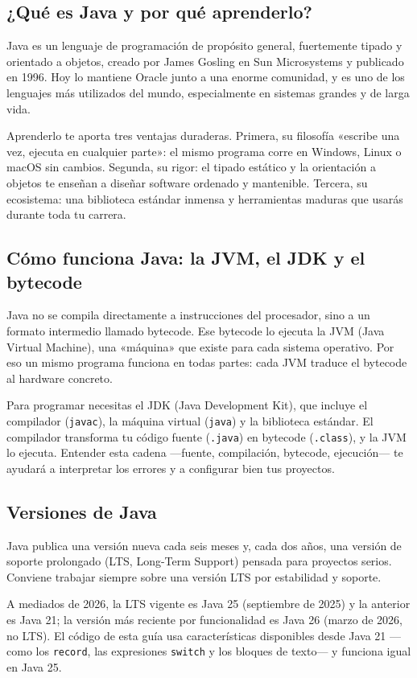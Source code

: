 \documentclass[11pt]{article}
\begin{document}
\subsection{¿Qué es Java y por qué aprenderlo?}
Java es un lenguaje de programación de propósito general, fuertemente tipado y orientado a objetos, creado por James Gosling en Sun Microsystems y publicado en 1996. Hoy lo mantiene Oracle junto a una enorme comunidad, y es uno de los lenguajes más utilizados del mundo, especialmente en sistemas grandes y de larga vida.

Aprenderlo te aporta tres ventajas duraderas. Primera, su filosofía «escribe una vez, ejecuta en cualquier parte»: el mismo programa corre en Windows, Linux o macOS sin cambios. Segunda, su rigor: el tipado estático y la orientación a objetos te enseñan a diseñar software ordenado y mantenible. Tercera, su ecosistema: una biblioteca estándar inmensa y herramientas maduras que usarás durante toda tu carrera.

\subsection{Cómo funciona Java: la JVM, el JDK y el bytecode}
Java no se compila directamente a instrucciones del procesador, sino a un formato intermedio llamado bytecode. Ese bytecode lo ejecuta la JVM (Java Virtual Machine), una «máquina» que existe para cada sistema operativo. Por eso un mismo programa funciona en todas partes: cada JVM traduce el bytecode al hardware concreto.

Para programar necesitas el JDK (Java Development Kit), que incluye el compilador (\texttt{javac}), la máquina virtual (\texttt{java}) y la biblioteca estándar. El compilador transforma tu código fuente (\texttt{.\allowbreak{}java}) en bytecode (\texttt{.\allowbreak{}class}), y la JVM lo ejecuta. Entender esta cadena —fuente, compilación, bytecode, ejecución— te ayudará a interpretar los errores y a configurar bien tus proyectos.

\subsection{Versiones de Java}
Java publica una versión nueva cada seis meses y, cada dos años, una versión de soporte prolongado (LTS, Long-Term Support) pensada para proyectos serios. Conviene trabajar siempre sobre una versión LTS por estabilidad y soporte.

A mediados de 2026, la LTS vigente es Java 25 (septiembre de 2025) y la anterior es Java 21; la versión más reciente por funcionalidad es Java 26 (marzo de 2026, no LTS). El código de esta guía usa características disponibles desde Java 21 —como los \texttt{record}, las expresiones \texttt{switch} y los bloques de texto— y funciona igual en Java 25.
\end{document}
